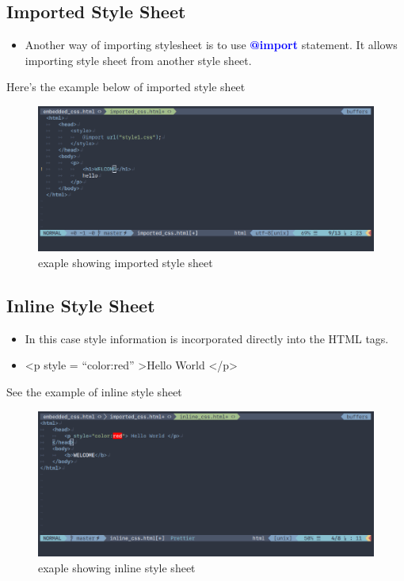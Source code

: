 \documentclass[a4paper,1pt,oneside]{article}
\begin{document}
\subsection{Imported Style Sheet}

\begin{itemize}
	\item Another way of importing stylesheet is to use \textcolor{blue}{\textbf{@import}} statement. It allows importing style sheet from another style sheet.
\end{itemize}

Here's the example below of imported style sheet

\begin{figure}[hbt!]
	\centering
	\includegraphics[width=1\textwidth]{images/2020-03-23-224759_996x431_scrot.png}
	\caption{exaple showing imported style sheet}
\end{figure}

\subsection{Inline Style Sheet}

\begin{itemize}
	\item In this case style information is incorporated directly into the HTML tags.
	\item \textless p style = ``color:red'' \textgreater Hello World </p>
\end{itemize}

See the example of inline style sheet

\begin{figure}[hbt!]
	\centering
	\includegraphics[width=1\textwidth]{images/2020-03-23-225058_996x431_scrot.png}
	\caption{exaple showing inline style sheet}
\end{figure}
\end{document}
